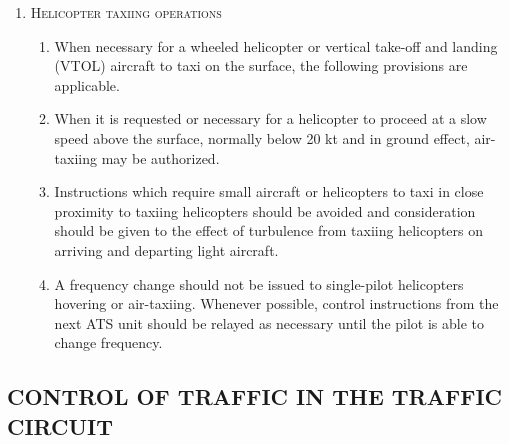 \documentclass[../vATM.tex]{subfiles}
\begin{document}
\begin{enumeratesc}
\begin{enumerate}[labelindent=0pt,itemsep=0.2cm]
            \item \textsc{Helicopter taxiing operations}
            \begin{enumerate}
                \item When necessary for a wheeled helicopter or vertical take-off and landing (VTOL) aircraft to taxi on the surface, the following provisions are applicable.
                \item When it is requested or necessary for a helicopter to proceed at a slow speed above the surface, normally below 20 kt and in ground effect, air-taxiing may be authorized.
                \item Instructions which require small aircraft or helicopters to taxi in close proximity to taxiing helicopters should be avoided and consideration should be given to the effect of turbulence from taxiing helicopters on arriving and departing light aircraft.
                \item A frequency change should not be issued to single-pilot helicopters hovering or air-taxiing. Whenever possible, control instructions from the next ATS unit should be relayed as necessary until the pilot is able to change frequency.
            \end{enumerate}
        \end{enumerate}

    \end{enumeratesc}

    \subsection[Control of traffic in the traffic circuit]{CONTROL OF TRAFFIC IN THE TRAFFIC CIRCUIT}
\end{document}
